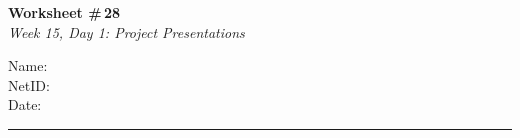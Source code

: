 \documentclass[11pt]{article}
\begin{document}
\noindent
\begin{minipage}[t]{0.55\textwidth}
  \vspace{0pt}
  {\LARGE \textbf{Worksheet \#\,28}} \\[0.3em]
  {\large \textit{Week 15, Day 1: Project Presentations}}
\end{minipage}
\hfill
\begin{minipage}[t]{0.40\textwidth}
  \vspace{0pt}
  \begin{mdframed}[linecolor=black, linewidth=1pt, innertopmargin=10pt, innerbottommargin=10pt]
    \small
    \vspace{0.4cm}
    Name: \underline{\hspace{4.5cm}} \\[1em]
    NetID: \underline{\hspace{4.3cm}} \\[1em]
    Date: \underline{\hspace{4.4cm}} \\
  \end{mdframed}
\end{minipage}

\vspace{1em}
\noindent\rule{\linewidth}{1pt}
\vspace{0.2em}
\end{document}
